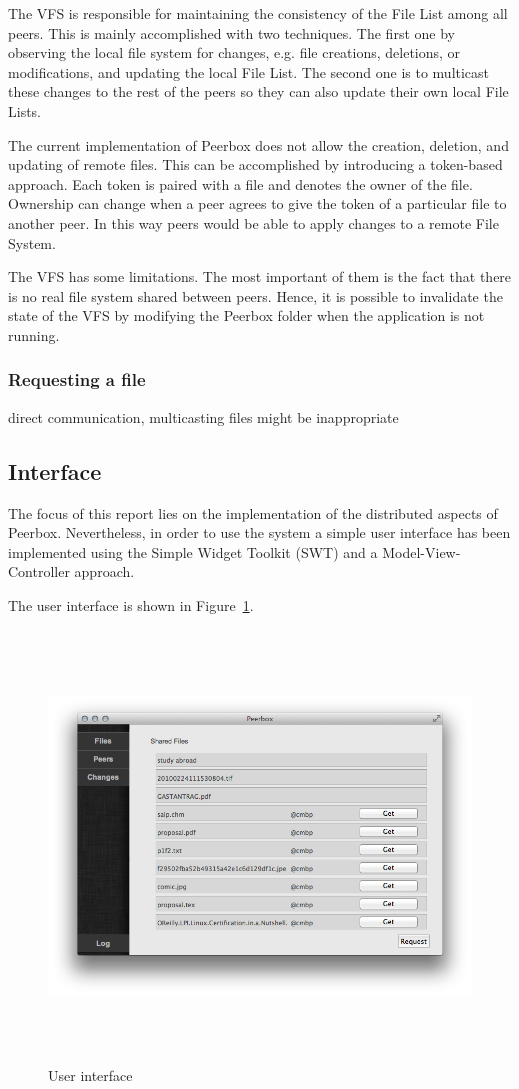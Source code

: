 The VFS is responsible for maintaining the consistency of the File List among all peers. This is mainly accomplished with two techniques. The first one by observing the local file system for changes, e.g. file creations, deletions, or modifications, and updating the local File List. The second one is to multicast these changes to the rest of the peers so they can also update their own local File Lists.

The current implementation of Peerbox does not allow the creation, deletion, and updating of remote files. This can be accomplished by introducing a token-based approach. Each token is paired with a file and denotes the owner of the file. Ownership can change when a peer agrees to give the token of a particular file to another peer. In this way peers would be able to apply changes to a remote File System.

The VFS has some limitations. The most important of them is the fact that there is no real file system shared between peers. Hence, it is possible to invalidate the state of the VFS by modifying the Peerbox folder when the application is not running.


\subsubsection{Requesting a file}
direct communication, multicasting files might be inappropriate


\subsection{Interface}
The focus of this report lies on the implementation of the distributed aspects of Peerbox. Nevertheless, in order to use the system a simple user interface has been implemented using the Simple Widget Toolkit (SWT) and a Model-View-Controller approach. 

The user interface is shown in Figure~\ref{fig:figures_gui}.
\begin{figure}[htbp]
    \centering
        \includegraphics[height=4.5in]{figures/gui.png}
    \caption{User interface}
    \label{fig:figures_gui}
\end{figure}
